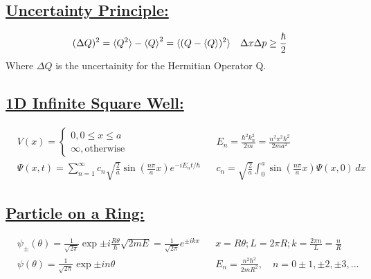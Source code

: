 \documentclass[a4paper,12pt]{article}
\begin{document}
\subsection*{\underline{Uncertainty Principle:}}
\begin{align*}
    &(\Delta Q)^2 = \braket{Q^2} - \braket{Q}^2 = \braket{(Q-\braket{Q})^2}
    &\Delta x \Delta p \geq \frac{\hbar}{2}
\end{align*}
Where $\Delta Q$ is the uncertainity for the Hermitian Operator Q.
\subsection*{\underline{1D Infinite Square Well:}}
\begin{align*}
    &V(x)=\left\{
        \begin{matrix}
            0, 0\leq x\leq a\\
            \infty, \mathrm{otherwise}
        \end{matrix}
    \right.
    &
    &E_n=\frac{\hbar^2k_n^2}{2m}=\frac{n^2\pi^2\hbar^2}{2ma^2}
    \\
    &\Psi(x,t)=\sum_{n=1}^\infty c_n\sqrt{\frac{2}{a}}\sin\left( \frac{n\pi}{a}x \right)e^{-iE_nt/\hbar}
    &
    &c_n=\sqrt{\frac{2}{a}}\int_0^a\sin\left( \frac{n\pi}{a}x \right)\Psi(x,0)\,dx
\end{align*}
\subsection*{\underline{Particle on a Ring:}}
\begin{align*}
    &\psi_\pm(\theta)=\frac{1}{\sqrt{2\pi}}\exp{\pm i\frac{R\theta}{\hbar}\sqrt{2mE}}=\frac{1}{\sqrt{2\pi}}e^{\pm ikx}
    &
    &x=R\theta; L=2\pi R; k=\frac{2\pi n}{L}=\frac{n}{R}
    \\
    &\psi(\theta)=\frac{1}{\sqrt{2\pi}}\exp{\pm in\theta}
    &
    &E_n=\frac{n^2\hbar^2}{2mR^2},\quad n=0\pm 1,\pm 2,\pm 3,...
\end{align*}
\end{document}
